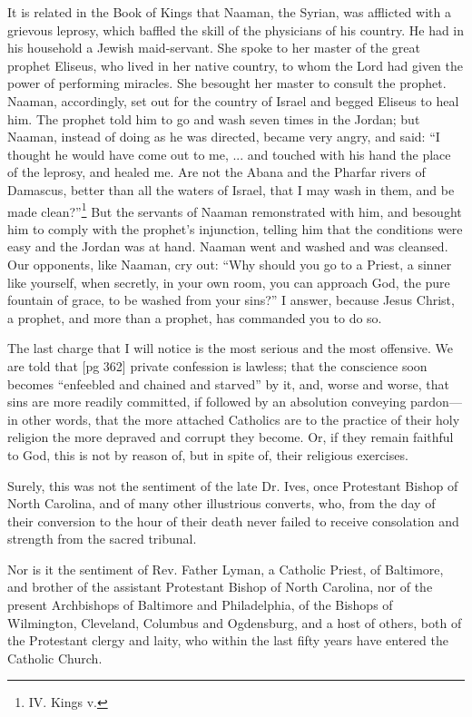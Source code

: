 It is related in the Book of Kings that Naaman,
the Syrian, was afflicted with a grievous
leprosy, which baffled the skill of the physicians of
his country. He had in his household a Jewish
maid-servant. She spoke to her master of the
great prophet Eliseus, who lived in her native
country, to whom the Lord had given the power of
performing miracles. She besought her master to
consult the prophet. Naaman, accordingly, set
out for the country of Israel and begged Eliseus to
heal him. The prophet told him to go and wash
seven times in the Jordan; but Naaman, instead of
doing as he was directed, became very angry, and
said: “I thought he would have come out to me, ...
and touched with his hand the place of the
leprosy, and healed me. Are not the Abana and
the Pharfar rivers of Damascus, better than all
the waters of Israel, that I may wash in them, and
be made clean?”\footnote{IV. Kings
v.} But the servants of Naaman
remonstrated with him, and besought him to comply
with the prophet's injunction, telling him that
the conditions were easy and the Jordan was at
hand. Naaman went and washed and was
cleansed. Our opponents, like Naaman, cry out:
“Why should you go to a Priest, a sinner like yourself,
when secretly, in your own room, you can approach
God, the pure fountain of grace, to be
washed from your sins?” I answer, because
Jesus Christ, a prophet, and more than a prophet,
has commanded you to do so.

The last charge that I will notice is the most
serious and the most offensive. We are told that
[pg 362]
private confession is lawless; that the conscience
soon becomes “enfeebled and chained and starved”
by it, and, worse and worse, that sins are more
readily committed, if followed by an absolution
conveying pardon—in other words, that the more
attached Catholics are to the practice of their holy
religion the more depraved and corrupt they become.
Or, if they remain faithful to God, this
is not by reason of, but in spite of, their religious
exercises.

Surely, this was not the sentiment of the late
Dr. Ives, once Protestant Bishop of North Carolina,
and of many other illustrious converts, who,
from the day of their conversion to the hour of
their death never failed to receive consolation and
strength from the sacred tribunal.

Nor is it the sentiment of Rev. Father Lyman,
a Catholic Priest, of Baltimore, and brother of the
assistant Protestant Bishop of North Carolina,
nor of the present Archbishops of Baltimore and
Philadelphia, of the Bishops of Wilmington, Cleveland,
Columbus and Ogdensburg, and a host of
others, both of the Protestant clergy and laity, who
within the last fifty years have entered the Catholic
Church.

